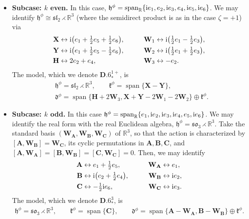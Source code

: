 \documentclass[pdftex]{sigma}
\newlength{\caseIndent}
\DeclareMathOperator{\spanOperator}{span}
\newcommand{\Span}[1]{\spanOperator\{{#1}\}}
\newcommand{\bbR}{\mathbb{R}}
\newcommand{\mbA}{\mathbf{A}}
\newcommand{\mbB}{\mathbf{B}}
\newcommand{\mbC}{\mathbf{C}}
\newcommand{\mbH}{\mathbf{H}}
\newcommand{\mbW}{\mathbf{W}}
\newcommand{\mbX}{\mathbf{X}}
\newcommand{\mbY}{\mathbf{Y}}
\newcommand{\mfd} {\mathfrak{d}}
\newcommand{\mfh} {\mathfrak{h}}
\newcommand{\mfk} {\mathfrak{k}}
\newcommand{\mfsl} {\mathfrak{sl}}
\newcommand{\mfso} {\mathfrak{so}}
\numberwithin{equation}{section}
\begin{document}
\begin{itemize}[leftmargin=\caseIndent]
	\item[] \textbf{Subcase: $k$ even.} In this case, $\mfh^{\phi} = \spanOperator_{\bbR}\{{\rm i} e_1, e_2, {\rm i} e_3, e_4, {\rm i} e_5, {\rm i} e_6\}$. We may identify $\mfh^{\phi} \cong \mfsl_2 \rightthreetimes \bbR^3$ (where the semidirect product is as in the case $\zeta = + 1$) via
	\begin{alignat*}{4}
		 \mbX &\leftrightarrow {\rm i}\big(e_1 + \tfrac{1}{2} e_5 + \tfrac{1}{2} e_6\big) , \qquad
		&\mbW_1 &\leftrightarrow {\rm i}\big(\tfrac{1}{2} e_1 - \tfrac{1}{2} e_3\big) , \\
		 \mbY &\leftrightarrow {\rm i}\big(e_1 + \tfrac{1}{2} e_5 - \tfrac{1}{2} e_6\big) , \qquad
		&\mbW_2 &\leftrightarrow {\rm i}\big(\tfrac{1}{2} e_1 + \tfrac{1}{2} e_3\big) , \\
		 \mbH &\leftrightarrow 2 e_2 + e_4 , \qquad
		&\mbW_3 &\leftrightarrow -e_2 .
	\end{alignat*}
The model, which we denote $\mathbf{D.6}_{\ast}^{1+}$, is
		\begin{equation*}
			\boxed{
 \begin{split}
 &\mfh^{\phi} = \mfsl_2 \rightthreetimes \bbR^3 , \qquad
	 	 \mfk^{\phi} = \Span{\mbX - \mbY} , \\
 &\mfd^{\phi} = \Span{\mbH + 2 \mbW_3, \mbX + \mbY - 2 \mbW_1 - 2 \mbW_2} \oplus \mfk^{\phi} .
 \end{split}
			}
		\end{equation*}
	\item[] \textbf{Subcase: $k$ odd.} In this case $\mfh^{\phi} = \spanOperator_{\bbR}\{e_1, {\rm i} e_2, {\rm i} e_3, {\rm i} e_4, e_5, {\rm i} e_6\}$. We may identify the real form with the real Euclidean algebra, $\mfh^{\phi} = \mfso_3 \rightthreetimes \bbR^3$. Take the standard basis $(\mbW_{\mbA}, \mbW_{\mbB}, \mbW_{\mbC})$ of $\bbR^3$, so that the action is characterized by $[\mbA, \mbW_{\mbB}] = \mbW_{\mbC}$, its cyclic permutations in $\mbA, \mbB, \mbC$, and $[\mbA, \mbW_{\mbA}] = [\mbB, \mbW_{\mbB}] = [\mbC, \mbW_{\mbC}] = 0$. Then, we may identify
	\begin{alignat*}{4}
		 \mbA &\leftrightarrow e_1 + \tfrac{1}{2} e_5 , \qquad
		&\mbW_{\mbA} &\leftrightarrow e_1 , \\
		 \mbB &\leftrightarrow {\rm i} \big(e_2 + \tfrac{1}{2} e_4\big) , \qquad
		&\mbW_{\mbB} &\leftrightarrow {\rm i} e_2 , \\
		 \mbC &\leftrightarrow -\tfrac{1}{2} {\rm i} e_6 , \qquad
		&\mbW_{\mbC} &\leftrightarrow {\rm i} e_3 .
	\end{alignat*}
The model, which we denote $\mathbf{D.6}_{\ast}^3$, is
	\begin{gather*}
		\boxed{
 \mfh^{\phi} = \mfso_3 \rightthreetimes \bbR^3 , \qquad
			\mfk^{\phi} = \Span{\mbC} , \qquad
			\mfd^{\phi} = \Span{\mbA - \mbW_{\mbA}, \mbB - \mbW_{\mbB}} \oplus \mfk^{\phi} .
		}
	\end{gather*}
\end{itemize}
\end{document}
